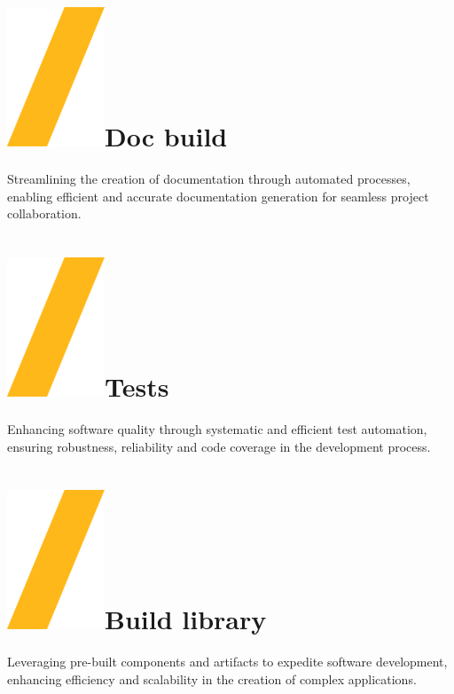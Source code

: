 \documentclass[a0paper,fleqn]{src/betterposter}
\begin{document}
{\section{\includegraphics[height=\fontcharht\font`\S]{img/general/slash.png}Doc build}
Streamlining the creation of documentation through automated processes, enabling
efficient and accurate documentation generation for seamless project
collaboration.

\section{\includegraphics[height=\fontcharht\font`\S]{img/general/slash.png}Tests}
Enhancing software quality through systematic and efficient test automation,
ensuring robustness, reliability and code coverage in the development process.




}{

\section{\includegraphics[height=\fontcharht\font`\S]{img/general/slash.png}Build library}
Leveraging pre-built components and artifacts to expedite software development,
enhancing efficiency and scalability in the creation of complex applications.

}
\end{document}

